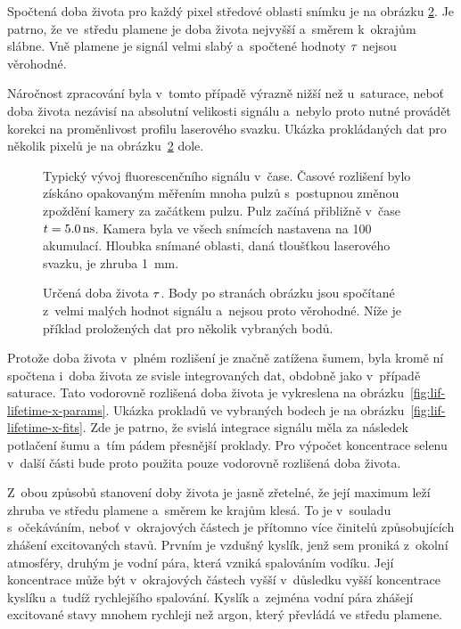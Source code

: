 Spočtená doba života pro každý pixel středové oblasti snímku je
na obrázku \ref{fig:lif-lifetime-full-params}.
Je patrno, že ve~středu plamene je doba života nejvyšší
a~směrem k~okrajům slábne.
Vně plamene je signál velmi slabý a~spočtené hodnoty $\tau$
nejsou věrohodné.

Náročnost zpracování byla v~tomto případě výrazně nižší než u~saturace,
neboť doba života nezávisí na absolutní velikosti signálu
a~nebylo proto nutné provádět korekci na proměnlivost profilu
laserového svazku.
Ukázka prokládaných dat pro několik pixelů je
na obrázku~\ref{fig:lif-lifetime-full-params} dole.

\begin{figure}[p]
	\centering
	
	\caption{Typický vývoj fluorescenčního signálu v~čase.
		Časové rozlišení bylo získáno opakovaným měřením mnoha pulzů
		s~postupnou změnou zpoždění kamery za začátkem pulzu.
		Pulz začíná přibližně v~čase $t = \SI{5.0}{\nano\second}$.
		Kamera byla ve všech snímcích nastavena na \num{100} akumulací.
		Hloubka snímané oblasti, daná tloušťkou laserového svazku,
		je zhruba \SI{1}{\milli\metre}.}
	\label{fig:lif-timeev}
\end{figure}

\begin{figure}[htp]
	\centering
	
	
	\caption{Určená doba života $\tau$.
		Body po stranách obrázku jsou spočítané z~velmi malých hodnot
		signálu a~nejsou proto věrohodné.
		Níže je příklad proložených dat pro několik vybraných bodů.}
	\label{fig:lif-lifetime-full-params}
\end{figure}

Protože doba života v~plném rozlišení je značně zatížena šumem,
byla kromě ní spočtena i~doba života ze svisle integrovaných dat,
obdobně jako v~případě saturace.
Tato vodorovně rozlišená doba života je vykreslena
na obrázku~\ref{fig:lif-lifetime-x-params}.
Ukázka prokladů ve vybraných bodech je
na obrázku~\ref{fig:lif-lifetime-x-fits}.
Zde je patrno, že svislá integrace signálu měla za následek potlačení šumu
a~tím pádem přesnější proklady.
Pro výpočet koncentrace selenu v~další části bude proto použita pouze
vodorovně rozlišená doba života.

Z~obou způsobů stanovení doby života je jasně zřetelné,
že její maximum leží zhruba ve středu plamene a~směrem ke krajům klesá.
To je v~souladu s~očekáváním, neboť v~okrajových částech je přítomno
více činitelů způsobujících zhášení excitovaných stavů.
Prvním je vzdušný kyslík, jenž sem proniká z~okolní atmosféry,
druhým je vodní pára, která vzniká spalováním vodíku.
Její koncentrace může být v~okrajových částech vyšší v~důsledku
vyšší koncentrace kyslíku a~tudíž rychlejšího spalování.
Kyslík a~zejména vodní pára zhášejí excitované stavy mnohem rychleji
než argon, který převládá ve středu plamene.


